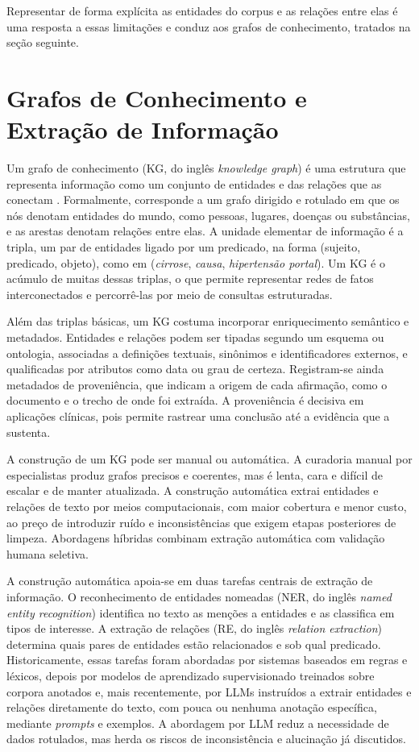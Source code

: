 Representar de forma explícita as entidades do corpus e as relações entre elas é uma resposta a essas limitações e conduz aos grafos de conhecimento, tratados na seção seguinte.

\section{Grafos de Conhecimento e Extração de Informação}\label{sec:kg}

Um grafo de conhecimento (KG, do inglês \textit{knowledge graph}) é uma estrutura que representa informação como um conjunto de entidades e das relações que as conectam \citep{hogan2021}. Formalmente, corresponde a um grafo dirigido e rotulado em que os nós denotam entidades do mundo, como pessoas, lugares, doenças ou substâncias, e as arestas denotam relações entre elas. A unidade elementar de informação é a tripla, um par de entidades ligado por um predicado, na forma (sujeito, predicado, objeto), como em (\textit{cirrose}, \textit{causa}, \textit{hipertensão portal}). Um KG é o acúmulo de muitas dessas triplas, o que permite representar redes de fatos interconectados e percorrê-las por meio de consultas estruturadas.

Além das triplas básicas, um KG costuma incorporar enriquecimento semântico e metadados. Entidades e relações podem ser tipadas segundo um esquema ou ontologia, associadas a definições textuais, sinônimos e identificadores externos, e qualificadas por atributos como data ou grau de certeza. Registram-se ainda metadados de proveniência, que indicam a origem de cada afirmação, como o documento e o trecho de onde foi extraída. A proveniência é decisiva em aplicações clínicas, pois permite rastrear uma conclusão até a evidência que a sustenta.

A construção de um KG pode ser manual ou automática. A curadoria manual por especialistas produz grafos precisos e coerentes, mas é lenta, cara e difícil de escalar e de manter atualizada. A construção automática extrai entidades e relações de texto por meios computacionais, com maior cobertura e menor custo, ao preço de introduzir ruído e inconsistências que exigem etapas posteriores de limpeza. Abordagens híbridas combinam extração automática com validação humana seletiva.

A construção automática apoia-se em duas tarefas centrais de extração de informação. O reconhecimento de entidades nomeadas (NER, do inglês \textit{named entity recognition}) identifica no texto as menções a entidades e as classifica em tipos de interesse. A extração de relações (RE, do inglês \textit{relation extraction}) determina quais pares de entidades estão relacionados e sob qual predicado. Historicamente, essas tarefas foram abordadas por sistemas baseados em regras e léxicos, depois por modelos de aprendizado supervisionado treinados sobre corpora anotados e, mais recentemente, por LLMs instruídos a extrair entidades e relações diretamente do texto, com pouca ou nenhuma anotação específica, mediante \textit{prompts} e exemplos. A abordagem por LLM reduz a necessidade de dados rotulados, mas herda os riscos de inconsistência e alucinação já discutidos.

